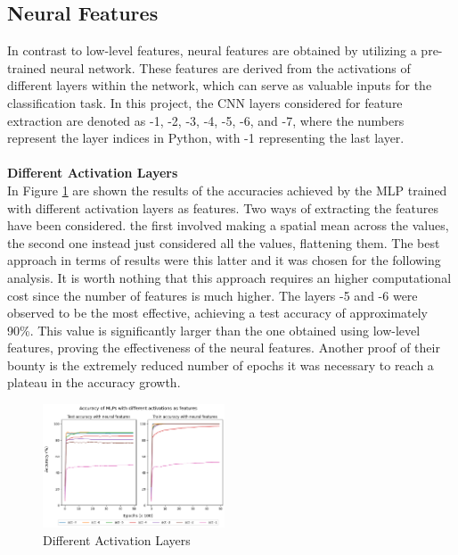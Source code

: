 \documentclass{article}
\begin{document}
\begin{multicols}{2}
\subsection{Neural Features}
In contrast to low-level features, neural features are obtained by utilizing a pre-trained neural network. These features are derived from the activations of different layers within 
the network, which can serve as valuable inputs for the classification task. In this project, the CNN layers considered for feature extraction are denoted as -1, -2, -3, -4, -5, -6, 
and -7, where the numbers represent the layer indices in Python, with -1 representing the last layer.\\
\\
\textbf{Different Activation Layers}\\
In Figure \ref{fig:act_layers} are shown the results of the accuracies achieved by the MLP trained with different activation layers as features. Two ways of extracting the
features have been considered. the first involved making a spatial mean across the values, the second one instead just considered all the values, flattening them. The best
approach in terms of results were this latter and it was chosen for the following analysis. It is worth nothing that this approach requires an higher computational cost since 
the number of features is much higher.
The layers -5 and -6 were observed to be
the most effective, achieving a test accuracy of approximately 90\%. This value is significantly larger than the one obtained using low-level features, proving the 
effectiveness of the neural features. Another proof of their bounty is the extremely reduced number of epochs it was necessary to reach a plateau in the accuracy growth.

    \begin{figure}[H]
        \centering
        \includegraphics[width=0.48\textwidth]{act_layers.png}
        \caption{Different Activation Layers}
        \label{fig:act_layers}
    \end{figure}



\end{multicols}
\end{document}
